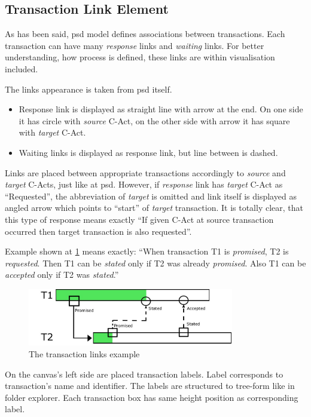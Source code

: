 \subsection{Transaction Link Element}
As has been said, \gls{psd} model defines associations between transactions. Each transaction can have many \textit{response} links and \textit{waiting} links. For better understanding, how process is defined, these links are within visualisation included. 

The links appearance is taken from \gls{psd} itself. 
\begin{itemize}
\item Response link is displayed as straight line with arrow at the end. On one side it has circle with \textit{source} C-Act, on the other side with arrow it has square with \textit{target} C-Act.
\item Waiting links is displayed as response link, but line between is dashed. 
\end{itemize}

Links are placed between appropriate transactions accordingly to \textit{source} and \textit{target} C-Acts, just like at \gls{psd}. However, if \textit{response} link has \textit{target} C-Act as ``Requested'', the abbreviation of \textit{target} is omitted and link itself is displayed as angled arrow which points to ``start'' of \textit{target} transaction. It is totally clear, that this type of response means exactly ``If given C-Act at  source transaction occurred then target transaction is also requested''.

Example shown at \cref{fig:box-state-state} means exactly: ``When transaction T1 is \textit{promised}, T2 is \textit{requested}. Then T1 can be \textit{stated} only if T2 was already \textit{promised}. Also T1 can be \textit{accepted} only if T2 was \textit{stated}.''

\begin{figure}[ht!]
\centering
\includegraphics[width=9cm,keepaspectratio]{img/box-links-example}
\caption{The transaction links example}
\label{fig:box-state-state}
\end{figure}

On the canvas's left side are placed transaction labels. Label corresponds to transaction's name and identifier. The labels are structured to tree-form like in folder explorer. Each transaction box has same height position as corresponding label. 

